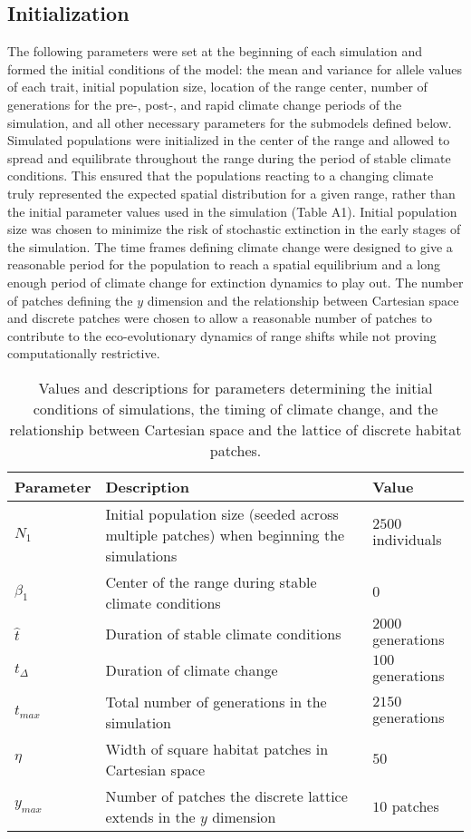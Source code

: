 \documentclass[11pt]{article}
\begin{document}
\subsection*{Initialization} 
The following parameters were set at the beginning of each simulation and formed the initial conditions of the model: the mean and variance for allele values of each trait, initial population size, location of the range center, number of generations for the pre-, post-, and rapid climate change periods of the simulation, and all other necessary parameters for the submodels defined below. Simulated populations were initialized in the center of the range and allowed to spread and equilibrate throughout the range during the period of stable climate conditions. This ensured that the populations reacting to a changing climate truly represented the expected spatial distribution for a given range, rather than the initial parameter values used in the simulation (Table A1). Initial population size was chosen to minimize the risk of stochastic extinction in the early stages of the simulation. The time frames defining climate change were designed to give a reasonable period for the population to reach a spatial equilibrium and a long enough period of climate change for extinction dynamics to play out. The number of patches defining the $y$ dimension and the relationship between Cartesian space and discrete patches were chosen to allow a reasonable number of patches to contribute to the eco-evolutionary dynamics of range shifts while not proving computationally restrictive.

\begin{table}
\renewcommand{\arraystretch}{1.5}
  \begin{tabular}{ p{2cm} | p{8cm} | p{4cm} }
    \hline
    Parameter & Description & Value \\ \hline \hline
    $N_{1}$ & Initial population size (seeded across multiple patches) when beginning the simulations & $2500$ individuals \\
    $\beta_{1}$ & Center of the range during stable climate conditions & $0$ \\
    $\hat{t}$ & Duration of stable climate conditions & $2000$ generations \\
    $t_{\Delta}$ & Duration of climate change & $100$ generations \\
    $t_{max}$ & Total number of generations in the simulation & $2150$ generations \\
    $\eta$ & Width of square habitat patches in Cartesian space & $50$ \\
    $y_{max}$ & Number of patches the discrete lattice extends in the $y$ dimension & $10$ patches \\
    \hline
  \end{tabular}
\caption[LoF entry]{Values and descriptions for parameters determining the initial conditions of simulations, the timing of climate change, and the relationship between Cartesian space and the lattice of discrete habitat patches.}
\label{table:InitPars}
\end{table}
\end{document}
